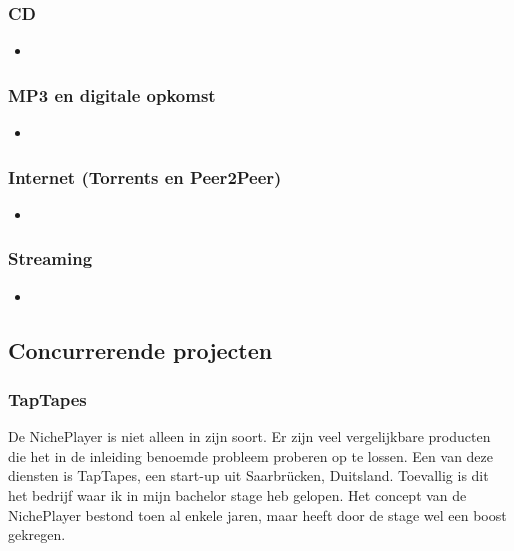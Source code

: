 \subsubsection*{CD}
\begin{itemize}
    \item 
\end{itemize}

\subsubsection*{MP3 en digitale opkomst}
\begin{itemize}
    \item 
\end{itemize}

\subsubsection*{Internet (Torrents en Peer2Peer)}
\begin{itemize}
    \item 
\end{itemize}

\subsubsection*{Streaming}
\begin{itemize}
    \item 
\end{itemize}

\subsection{Concurrerende projecten}
\subsubsection*{TapTapes}
De NichePlayer is niet alleen in zijn soort. Er zijn veel vergelijkbare producten die het in de inleiding benoemde probleem proberen op te lossen. Een van deze diensten is TapTapes, een start-up uit Saarbrücken, Duitsland. Toevallig is dit het bedrijf waar ik in mijn bachelor stage heb gelopen. Het concept van de NichePlayer bestond toen al enkele jaren, maar heeft door de stage wel een boost gekregen.

